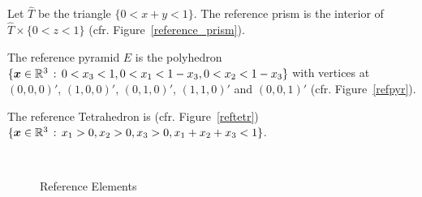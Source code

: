 \begin{defi}\label{defi_of_ref_prism}
  Let $\hat T$ be the triangle $\{ 0 < x + y < 1 \}$. 
  The reference prism is the interior of 
  $\hat T\times\{ 0 < z < 1 \}$ (cfr. Figure~\ref{reference_prism}).
\end{defi}
\begin{defi}\label{defi_of_ref_pyr}
The reference pyramid $\hat E$ is the polyhedron 
$\{\boldsymbol{x}\in\mathbb{R}^3\,:\,0< x_3< 1,
0<  x_1<  1-x_3, 0<  x_2<  1-x_3\}$
with vertices at $(0,0,0)'$,
$(1,0,0)'$, $(0,1,0)'$, $(1,1,0)'$ and $(0,0,1)'$ (cfr. Figure~\ref{refpyr}).
\end{defi}
\begin{defi}\label{def_of_ref_elems}
The reference Tetrahedron is (cfr. Figure~\ref{reftetr})
$\{\boldsymbol{x}\in\mathbb{R}^3\,:\,x_1 > 0, x_2 > 0, x_3 > 0, x_1+x_2+x_3 < 1\}$.
\end{defi}

\begin{figure}
	\centering
  \\
	\caption{Reference Elements}
\end{figure}


